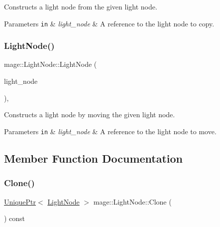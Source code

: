 Constructs a light node from the given light node.


\begin{DoxyParams}[1]{Parameters}
\mbox{\tt in}  & {\em light\+\_\+node} & A reference to the light node to copy. \\
\hline
\end{DoxyParams}
\hypertarget{classmage_1_1_light_node_a0a2d5ee9e6417d73905d6f35116eccb3}{}\label{classmage_1_1_light_node_a0a2d5ee9e6417d73905d6f35116eccb3} 
\subsubsection{\texorpdfstring{Light\+Node()}{LightNode()}\hspace{0.1cm}{\footnotesize\ttfamily [3/3]}}
{\footnotesize\ttfamily mage\+::\+Light\+Node\+::\+Light\+Node (\begin{DoxyParamCaption}\item[{\hyperlink{classmage_1_1_light_node}{Light\+Node} \&\&}]{light\+\_\+node }\end{DoxyParamCaption})\hspace{0.3cm}{\ttfamily [protected]}, {\ttfamily [default]}}

Constructs a light node by moving the given light node.


\begin{DoxyParams}[1]{Parameters}
\mbox{\tt in}  & {\em light\+\_\+node} & A reference to the light node to move. \\
\hline
\end{DoxyParams}


\subsection{Member Function Documentation}
\hypertarget{classmage_1_1_light_node_a4d0c10f03de71cd497635feb431d02d5}{}\label{classmage_1_1_light_node_a4d0c10f03de71cd497635feb431d02d5} 
\subsubsection{\texorpdfstring{Clone()}{Clone()}}
{\footnotesize\ttfamily \hyperlink{namespacemage_a3316d7143a973e37adf1110f2e80ca31}{Unique\+Ptr}$<$ \hyperlink{classmage_1_1_light_node}{Light\+Node} $>$ mage\+::\+Light\+Node\+::\+Clone (\begin{DoxyParamCaption}{ }\end{DoxyParamCaption}) const}

